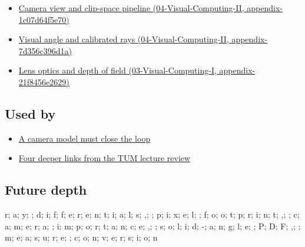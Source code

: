 \begin{itemize}
\tightlist
\item
  \href{}{Camera view and clip-space pipeline (04-Visual-Computing-II, appendix-1c07d64f5e70)}
\item
  \href{}{Visual angle and calibrated rays (04-Visual-Computing-II, appendix-7d356c396d1a)}
\item
  \href{}{Lens optics and depth of field (03-Visual-Computing-I, appendix-21f8456e2629)}
\end{itemize}

\subsection{Used by}\label{used-by}

\begin{itemize}
\tightlist
\item
  \href{Continuous\%20Notes/Computing\%20Foundations\%20-\%20From\%20Bits\%20to\%20C++\%20and\%20Systems\%20APIs\#A\%20camera\%20model\%20must\%20close\%20the\%20loop}{A camera model must close the loop}
\item
  \href{Continuous\%20Notes/Computing\%20Foundations\%20-\%20From\%20Bits\%20to\%20C++\%20and\%20Systems\%20APIs\#Four\%20deeper\%20links\%20from\%20the\%20TUM\%20lecture\%20review}{Four deeper links from the TUM lecture review}
\end{itemize}

\subsection{Future depth}\label{future-depth}

r; a; y; ; d; i; f; f; e; r; e; n; t; i; a; l; s; ,; ; p; i; x; e; l; ; f; o; o; t; p; r; i; n; t; ,; ; c; a; m; e; r; a; ; i; m; p; o; r; t; a; n; c; e; ,; ; s; o; l; i; d; -; a; n; g; l; e; ; P; D; F; ,; ; m; e; a; s; u; r; e; ; c; o; n; v; e; r; s; i; o; n
